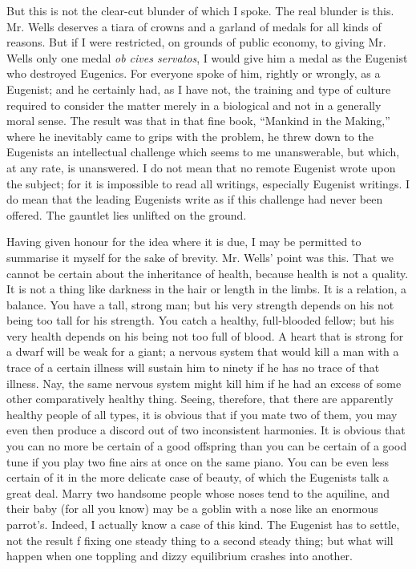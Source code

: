 \documentclass{book}
\begin{document}
But this is not the clear-cut blunder of which I spoke. The real blunder is this. Mr. Wells deserves a tiara of crowns and a garland of medals for all kinds of reasons. But if I were restricted, on grounds of public economy, to giving Mr. Wells only one medal \emph{ob cives servatos}, I would give him a medal as the Eugenist who destroyed Eugenics. For everyone spoke of him, rightly or wrongly, as a Eugenist; and he certainly had, as I have not, the training and type of culture required to consider the matter merely in a biological and not in a generally moral sense. The result was that in that fine book, “Mankind in the Making,” where he inevitably came to grips with the problem, he threw down to the Eugenists an intellectual challenge which seems to me unanswerable, but which, at any rate, is unanswered. I do not mean that no remote Eugenist wrote upon the subject; for it is impossible to read all writings, especially Eugenist writings. I do mean that the leading Eugenists write as if this challenge had never been offered. The gauntlet lies unlifted on the ground.

Having given honour for the idea where it is due, I may be permitted to summarise it myself for the sake of brevity. Mr. Wells’ point was this. That we cannot be certain about the inheritance of health, because health is not a quality. It is not a thing like darkness in the hair or length in the limbs. It is a relation, a balance. You have a tall, strong man; but his very strength depends on his not being too tall for his strength. You catch a healthy, full-blooded fellow; but his very health depends on his being not too full of blood. A heart that is strong for a dwarf will be weak for a giant; a nervous system that would kill a man with a trace of a certain illness will sustain him to ninety if he has no trace of that illness. Nay, the same nervous system might kill him if he had an excess of some other comparatively healthy thing. Seeing, therefore, that there are apparently healthy people of all types, it is obvious that if you mate two of them, you may even then produce a discord out of two inconsistent harmonies. It is obvious that you can no more be certain of a good offspring than you can be certain of a good tune if you play two fine airs at once on the same piano. You can be even less certain of it in the more delicate case of beauty, of which the Eugenists talk a great deal. Marry two handsome people whose noses tend to the aquiline, and their baby (for all you know) may be a goblin with a nose like an enormous parrot’s. Indeed, I actually know a case of this kind. The Eugenist has to settle, not the result f fixing one steady thing to a second steady thing; but what will happen when one toppling and dizzy equilibrium crashes into another.
\end{document}
